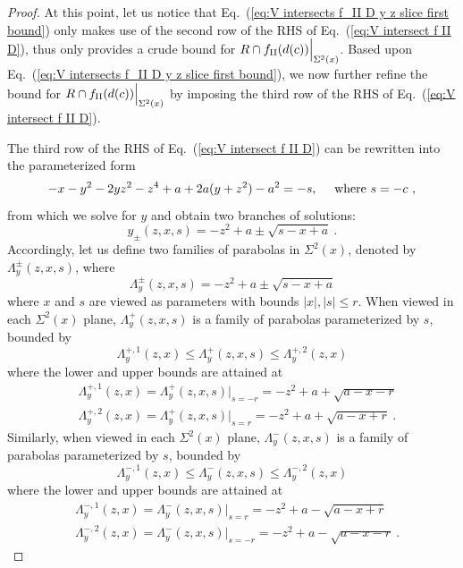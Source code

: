 \documentclass[12pt]{iopart}
\begin{document}
\begin{proof}
At this point, let us notice that Eq.~(\ref{eq:V intersects f_II D y z slice first bound}) only makes use of the second row of the RHS of Eq.~(\ref{eq:V intersect f II D}), thus only provides a crude bound for $R \cap f_{\rm II}(d(c)) \Big|_{\Sigma^2(x)}$. Based upon Eq.~(\ref{eq:V intersects f_II D y z slice first bound}), we now further refine the bound for $R \cap f_{\rm II}(d(c)) \Big|_{\Sigma^2(x)}$ by imposing the third row of the RHS of Eq.~(\ref{eq:V intersect f II D}). 

The third row of the RHS of Eq.~(\ref{eq:V intersect f II D}) can be rewritten into the parameterized form
\begin{equation}\label{eq:y z parabola 2 f_II}
-x - y^2 -2 y z^2 - z^4 + a + 2 a (y + z^2) - a^2 = -s, ~~~~{\rm where}~ s=-c\ ,
\end{equation}
from which we solve for $y$ and obtain two branches of solutions:
\begin{equation}\label{eq: y z parabola 2 f_II two branches}
y_{\pm}(z,x,s) = -z^2 + a \pm \sqrt{s-x+a}\ .
\end{equation}
Accordingly, let us define two families of parabolas in $\Sigma^2(x)$, denoted by $\Lambda^{\pm}_y(z,x,s)$, where
\begin{equation}\label{eq:Lambda y in terms of z x s}
\Lambda^{\pm}_y(z,x,s) = -z^2 + a \pm \sqrt{s-x+a}
\end{equation}
where $x$ and $s$ are viewed as parameters with bounds $|x|,|s| \leq r$. When viewed in each $\Sigma^2(x)$ plane, $\Lambda^{+}_y(z,x,s)$ is a family of parabolas parameterized by $s$, bounded by
\begin{equation}\label{eq:Lambda y + lower and upper bounds on each slice}
\Lambda^{+,1}_y(z,x) \leq \Lambda^{+}_y(z,x,s) \leq \Lambda^{+,2}_y(z,x)
\end{equation} 
where the lower and upper bounds are attained at
\begin{eqnarray}
& \Lambda^{+,1}_y(z,x) = \Lambda^+_y(z,x,s)|_{s=-r} = -z^2 + a + \sqrt{a-x-r}  \label{eq:Lambda y + 1} \\
& \Lambda^{+,2}_y(z,x) = \Lambda^+_y(z,x,s)|_{s=r} = -z^2 + a + \sqrt{a-x+r}  \label{eq:Lambda y + 2}\ .
\end{eqnarray}
Similarly, when viewed in each $\Sigma^2(x)$ plane, $\Lambda^{-}_y(z,x,s)$ is a family of parabolas parameterized by $s$, bounded by
\begin{equation}\label{eq:Lambda y - lower and upper bounds on each slice}
\Lambda^{-,1}_y(z,x) \leq \Lambda^{-}_y(z,x,s) \leq \Lambda^{-,2}_y(z,x)
\end{equation} 
where the lower and upper bounds are attained at
\begin{eqnarray}
& \Lambda^{-,1}_y(z,x) = \Lambda^-_y(z,x,s)|_{s=r} = -z^2 + a - \sqrt{a-x+r}  \label{eq:Lambda y - 1} \\
& \Lambda^{-,2}_y(z,x) = \Lambda^-_y(z,x,s)|_{s=-r} = -z^2 + a - \sqrt{a-x-r}  \label{eq:Lambda y - 2}\ .
\end{eqnarray}


\end{proof}
\end{document}
